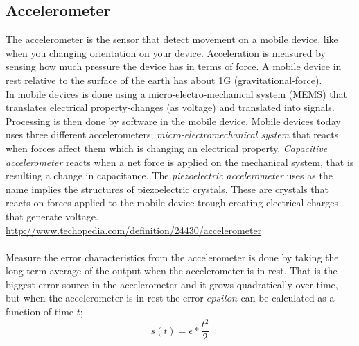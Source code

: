 \subsection{Accelerometer}\label{sec:accelerometer}
The accelerometer is the sensor that detect movement on a mobile device, like when you changing orientation on your device. Acceleration is measured by sensing how much pressure the device has in terms of force. A mobile device in rest relative to the surface of the earth has about 1G (gravitational-force). \cite{sensors:allref}\\
In mobile devices is done using a micro-electro-mechanical system (MEMS) that translates electrical property-changes (as voltage) and translated into signals. Processing is then done by software in the mobile device. Mobile devices today uses three different accelerometers; \textit{micro-electromechanical system} that reacts when forces affect them which is changing an electrical property. \textit{Capacitive accelerometer} reacts when a net force is applied on the mechanical system, that is resulting a change in capacitance. The \textit{piezoelectric accelerometer} uses as the name implies the structures of piezoelectric crystals. These are crystals that reacts on forces applied to the mobile device trough creating electrical charges that generate voltage. 
\url{http://www.techopedia.com/definition/24430/accelerometer} \\
\\
Measure the error characteristics from the accelerometer is done by taking the long term average of the output when the accelerometer is in rest. That is the biggest error source in the accelerometer and it grows quadratically over time, but when the accelerometer is in rest the error $epsilon$ can be calculated as a function of time $t$;
$$s(t)=\epsilon * \frac{t^2}{2} $$
\cite{sensor:inertialNav}\\
\\


